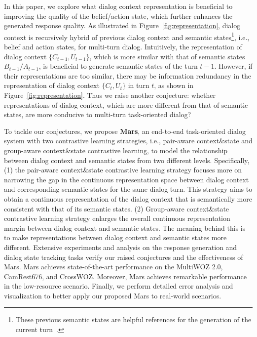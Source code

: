 In this paper, we explore what dialog context representation is beneficial to improving the quality of the belief/action state, which further enhances the generated response quality.
As illustrated in Figure~\ref{fig:representation}, dialog context is recursively hybrid of previous dialog context and semantic states\footnote{These previous semantic states are  helpful references for the generation of the current turn~\cite{DBLP:conf/aaai/YangLQ21}.}, i.e., belief and action states, for multi-turn dialog.  
Intuitively, the representation of dialog context $\{C_{t-1},U_{t-1}\}$, which is more similar with that of semantic states $B_{t-1}/A_{t-1}$, is beneficial to generate semantic states of the  turn $t-1$. However, if their representations are too similar, there may be information redundancy in the representation of dialog context $\{C_{t},U_{t}\}$ in  turn $t$, as shown in Figure~\ref{fig:representation}. Thus we raise another conjecture: whether representations of dialog context, which are more different from that of semantic states, are more conducive to multi-turn task-oriented dialog?

To tackle our conjectures, we propose \textbf{Mars}, an end-to-end task-oriented dialog system with two contrastive learning strategies, i.e., pair-aware context\&state and group-aware context\&state contrastive learning, to model the relationship between dialog context and semantic states from two different levels.
Specifically, (1) the pair-aware context\&state contrastive learning strategy focuses more on narrowing the gap in the continuous representation space between dialog context and corresponding semantic states for the same dialog turn.
This strategy aims to obtain a continuous representation of the dialog context that is  semantically more consistent with that of its semantic states.
(2) Group-aware context\&state contrastive learning strategy enlarges the overall continuous representation margin between dialog context and semantic states.
The meaning behind this is to make representations between dialog context and semantic states more different.
Extensive experiments and analysis on the response generation and dialog state tracking tasks verify our raised conjectures and the effectiveness of Mars.
Mars achieves state-of-the-art performance on the MultiWOZ 2.0, CamRest676, and CrossWOZ.   Moreover, Mars  achieves remarkable performance in the low-resource scenario. Finally, we perform detailed error analysis and visualization to better apply our proposed Mars to real-world scenarios.

